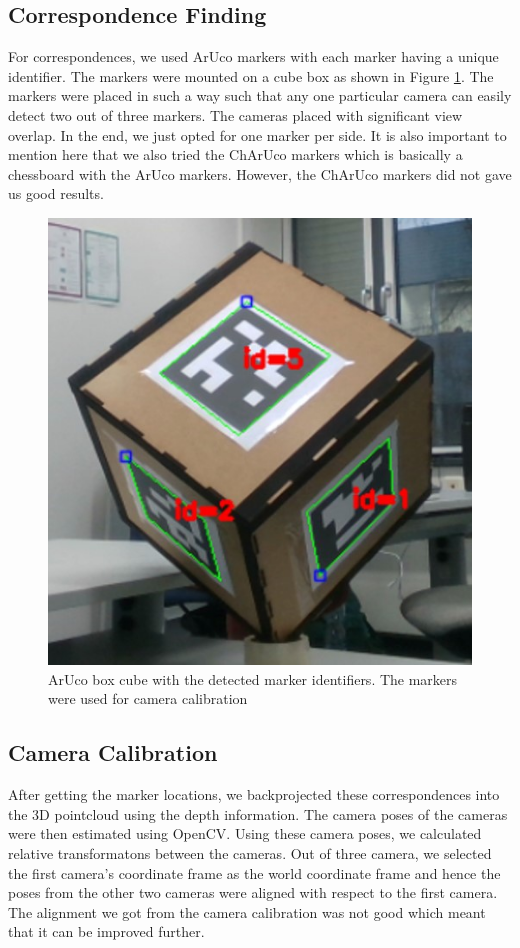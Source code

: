 \documentclass[10pt,twocolumn,letterpaper]{article}
\begin{document}
%

\subsection{Correspondence Finding}
For correspondences, we used ArUco markers with each marker having a unique identifier. The markers were mounted on a cube box as shown in Figure \ref{fig:cube}. The markers were placed in such a way such that any one particular camera can easily detect two out of three markers. The cameras placed with significant view overlap. In the end, we just opted for one marker per side. It is also important to mention here that we also tried the ChArUco markers which is basically a chessboard with the ArUco markers. However, the ChArUco markers did not gave us good results. 


\begin{figure}[t]
	\begin{center}
		\includegraphics[width=0.6\linewidth]{imgs/cube}
	\end{center}
	\caption{ArUco box cube with the detected marker identifiers. The markers were used for camera calibration}
	\label{fig:cube}
\end{figure}


\subsection{Camera Calibration}
After getting the marker locations, we backprojected these correspondences into the 3D pointcloud using the depth information. The camera poses of the cameras were then estimated using OpenCV. Using these camera poses, we calculated relative transformatons between the cameras. Out of three camera, we selected the first camera's coordinate frame as the world coordinate frame and hence the poses from the other two cameras were aligned with respect to the first camera. The alignment we got from the camera calibration was not good which meant that it can be improved further.
\end{document}
